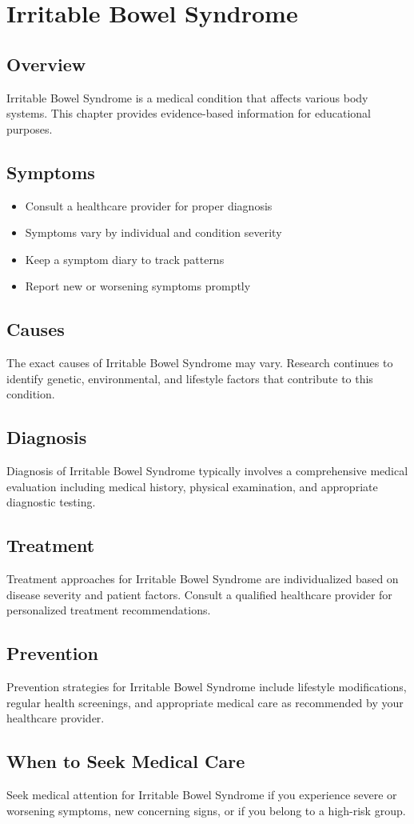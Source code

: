 \chapter{Irritable Bowel Syndrome}

\section*{Overview}
Irritable Bowel Syndrome is a medical condition that affects various body systems. This chapter provides evidence-based information for educational purposes.

\section*{Symptoms}
\begin{itemize}
  \item Consult a healthcare provider for proper diagnosis
  \item Symptoms vary by individual and condition severity
  \item Keep a symptom diary to track patterns
  \item Report new or worsening symptoms promptly
\end{itemize}

\section*{Causes}
The exact causes of Irritable Bowel Syndrome may vary. Research continues to identify genetic, environmental, and lifestyle factors that contribute to this condition.

\section*{Diagnosis}
Diagnosis of Irritable Bowel Syndrome typically involves a comprehensive medical evaluation including medical history, physical examination, and appropriate diagnostic testing.

\section*{Treatment}
Treatment approaches for Irritable Bowel Syndrome are individualized based on disease severity and patient factors. Consult a qualified healthcare provider for personalized treatment recommendations.

\section*{Prevention}
Prevention strategies for Irritable Bowel Syndrome include lifestyle modifications, regular health screenings, and appropriate medical care as recommended by your healthcare provider.

\section*{When to Seek Medical Care}
Seek medical attention for Irritable Bowel Syndrome if you experience severe or worsening symptoms, new concerning signs, or if you belong to a high-risk group.
\clearpage
